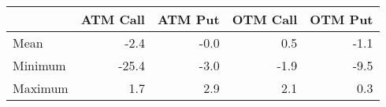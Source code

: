 \begin{tabular}{lrrrr}
\hline
         &   ATM Call &   ATM Put &   OTM Call &   OTM Put \\
\hline
 Mean    &       -2.4 &      -0.0 &        0.5 &      -1.1 \\
 Minimum &      -25.4 &      -3.0 &       -1.9 &      -9.5 \\
 Maximum &        1.7 &       2.9 &        2.1 &       0.3 \\
\hline
\end{tabular}